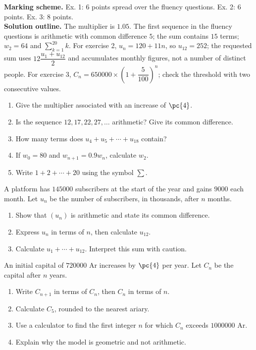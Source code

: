 \begin{solution}\textbf{Marking scheme.} Ex. 1: 6 points spread over the fluency questions. Ex. 2: 6 points. Ex. 3: 8 points.\\
\textbf{Solution outline.} The multiplier is $\num{1,05}$. The first sequence in the fluency questions is arithmetic with common difference $5$; the sum contains $15$ terms; $w_2=64$ and $\sum_{k=1}^{20}k$. For exercise 2, $u_n=120+11n$, so $u_{12}=252$; the requested sum uses $12\dfrac{u_1+u_{12}}2$ and accumulates monthly figures, not a number of distinct people. For exercise 3, $C_n=\num{650000}\times\left(1+\dfrac{5}{100}\right)^n$; check the threshold with two consecutive values.\end{solution}

\begin{exercise}[1 -- Fluency]
\begin{enumerate}
\item Give the multiplier associated with an increase of $\pc{4}$.
\item Is the sequence $12,17,22,27,\ldots$ arithmetic? Give its common difference.
\item How many terms does $u_4+u_5+\cdots+u_{18}$ contain?
\item If $w_0=80$ and $w_{n+1}=\num{0,9}w_n$, calculate $w_2$.
\item Write $1+2+\cdots+20$ using the symbol $\sum$.
\end{enumerate}
\end{exercise}
\begin{exercise}[2 -- Subscriptions]
A platform has $\num{145000}$ subscribers at the start of the year and gains $\num{9000}$ each month. Let $u_n$ be the number of subscribers, in thousands, after $n$ months.
\begin{enumerate}
\item Show that $(u_n)$ is arithmetic and state its common difference.
\item Express $u_n$ in terms of $n$, then calculate $u_{12}$.
\item Calculate $u_1+\cdots+u_{12}$. Interpret this sum with caution.
\end{enumerate}
\end{exercise}
\begin{exercise}
An initial capital of $\num{720000}$ Ar increases by $\pc{4}$ per year. Let $C_n$ be the capital after $n$ years.
\begin{enumerate}
\item Write $C_{n+1}$ in terms of $C_n$, then $C_n$ in terms of $n$.
\item Calculate $C_5$, rounded to the nearest ariary.
\item Use a calculator to find the first integer $n$ for which $C_n$ exceeds $\num{1000000}$ Ar.
\item Explain why the model is geometric and not arithmetic.
\end{enumerate}
\end{exercise}
